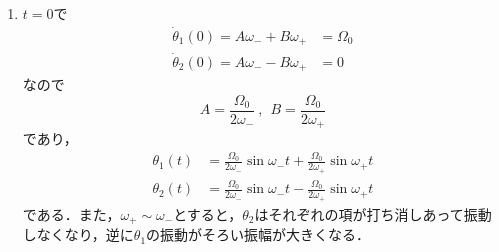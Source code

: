 \documentclass[a4paper,pdflatex,ja=standard]{bxjsarticle}
\begin{document}
\begin{enumerate}
  \item 
  $t=0$で
  \begin{align}
    \dot{\theta}_{1}(0)
    =
    A\omega_{-}+B\omega_{+}
    &=
    \Omega_{0}
    \\
    \dot{\theta}_{2}(0)
    =
    A\omega_{-}-B\omega_{+}
    &=
    0
  \end{align}
  なので
  \begin{equation}
    A
    =
    \frac{\Omega_{0}}{2\omega_{-}}
    \ ,\ \ 
    B
    =
    \frac{\Omega_{0}}{2\omega_{+}}
  \end{equation}
  であり，
  \begin{align}
    \theta_{1}(t)
    &=    
    \frac{\Omega_{0}}{2\omega_{-}}
    \sin\omega_{-}t
    +    
    \frac{\Omega_{0}}{2\omega_{+}}
    \sin\omega_{+}t
    \\
    \theta_{2}(t)
    &=
    \frac{\Omega_{0}}{2\omega_{-}}
    \sin\omega_{-}t
    -
    \frac{\Omega_{0}}{2\omega_{+}}
    \sin\omega_{+}t
  \end{align}
  である．また，$\omega_{+}\sim\omega_{-}$とすると，$\theta_{2}$はそれぞれの項が打ち消しあって振動しなくなり，逆に$\theta_{1}$の振動がそろい振幅が大きくなる．

\end{enumerate}
\end{document}
